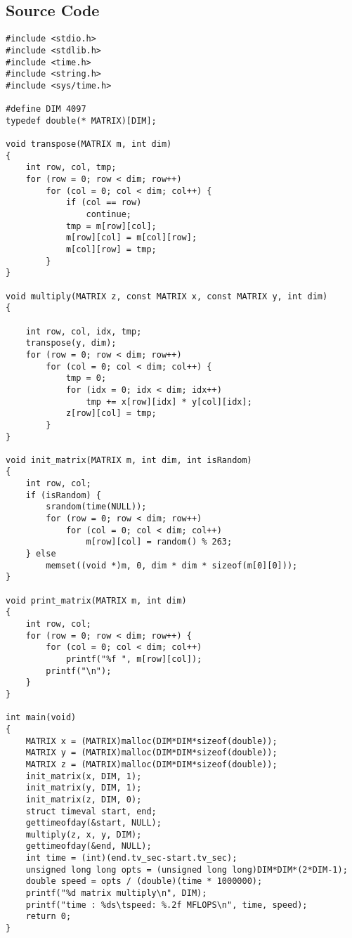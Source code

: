\documentclass[a4paper, 11pt]{article}
\begin{document}
\subsection{Source Code}
\begin{verbatim}
#include <stdio.h>
#include <stdlib.h>
#include <time.h>
#include <string.h>
#include <sys/time.h>

#define DIM 4097
typedef double(* MATRIX)[DIM];

void transpose(MATRIX m, int dim)
{
    int row, col, tmp;
    for (row = 0; row < dim; row++)
        for (col = 0; col < dim; col++) {
            if (col == row)
                continue;
            tmp = m[row][col];
            m[row][col] = m[col][row];
            m[col][row] = tmp;
        }
}

void multiply(MATRIX z, const MATRIX x, const MATRIX y, int dim)
{

    int row, col, idx, tmp;
    transpose(y, dim);
    for (row = 0; row < dim; row++)
        for (col = 0; col < dim; col++) {
            tmp = 0;
            for (idx = 0; idx < dim; idx++)
                tmp += x[row][idx] * y[col][idx];
            z[row][col] = tmp;
        }
}

void init_matrix(MATRIX m, int dim, int isRandom)
{
    int row, col;
    if (isRandom) {
        srandom(time(NULL));
        for (row = 0; row < dim; row++)
            for (col = 0; col < dim; col++)
                m[row][col] = random() % 263;
    } else
        memset((void *)m, 0, dim * dim * sizeof(m[0][0]));
}

void print_matrix(MATRIX m, int dim)
{
    int row, col;
    for (row = 0; row < dim; row++) {
        for (col = 0; col < dim; col++)
            printf("%f ", m[row][col]);
        printf("\n");
    }
}

int main(void)
{
    MATRIX x = (MATRIX)malloc(DIM*DIM*sizeof(double));
    MATRIX y = (MATRIX)malloc(DIM*DIM*sizeof(double));
    MATRIX z = (MATRIX)malloc(DIM*DIM*sizeof(double));
    init_matrix(x, DIM, 1);
    init_matrix(y, DIM, 1);
    init_matrix(z, DIM, 0);
    struct timeval start, end;
    gettimeofday(&start, NULL);
    multiply(z, x, y, DIM);
    gettimeofday(&end, NULL);
    int time = (int)(end.tv_sec-start.tv_sec);
    unsigned long long opts = (unsigned long long)DIM*DIM*(2*DIM-1);
    double speed = opts / (double)(time * 1000000);
    printf("%d matrix multiply\n", DIM);
    printf("time : %ds\tspeed: %.2f MFLOPS\n", time, speed);
    return 0;
}
\end{verbatim}
\end{document}
